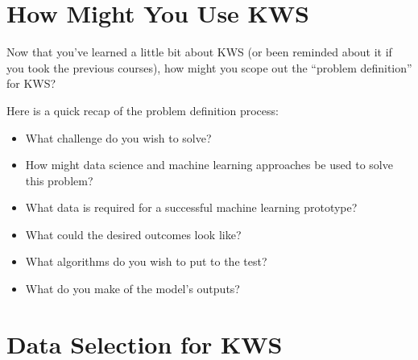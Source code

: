 \section{How Might You Use KWS}

Now that you’ve learned a little bit about KWS (or been reminded about it if you took the previous courses), how might you scope out the “problem definition” for KWS?

Here is a quick recap of the problem definition process:

\begin{itemize}
  \item What challenge do you wish to solve?
  \item How might data science and machine learning approaches be used to solve this problem?
  \item What data is required for a successful machine learning prototype?
  \item What could the desired outcomes look like?
  \item What algorithms do you wish to put to the test?
  \item What do you make of the model's outputs?   
\end{itemize}
         
\section{Data Selection for KWS}

